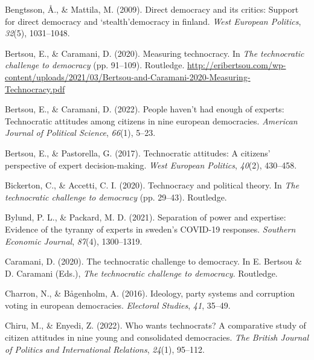 \documentclass[
  12pt,
  english,
]{article}
\newlength{\cslhangindent}
\newlength{\cslentryspacingunit} %
\newenvironment{CSLReferences}[2] %
 {%
  \setlength{\parindent}{0pt}
  \ifodd #1
  \let\oldpar\par
  \def\par{\hangindent=\cslhangindent\oldpar}
  \fi
  \setlength{\parskip}{#2\cslentryspacingunit}
 }%
 {}
\begin{document}
\hypertarget{refs}{}
\begin{CSLReferences}{1}{0}
\leavevmode{}%
Bengtsson, Å., \& Mattila, M. (2009). Direct democracy and its critics:
Support for direct democracy and `stealth'democracy in finland.
\emph{West European Politics}, \emph{32}(5), 1031--1048.

\leavevmode{}%
Bertsou, E., \& Caramani, D. (2020). Measuring technocracy. In \emph{The
technocratic challenge to democracy} (pp. 91--109). Routledge.
\url{http://eribertsou.com/wp-content/uploads/2021/03/Bertsou-and-Caramani-2020-Measuring-Technocracy.pdf}

\leavevmode{}%
Bertsou, E., \& Caramani, D. (2022). People haven't had enough of
experts: Technocratic attitudes among citizens in nine european
democracies. \emph{American Journal of Political Science}, \emph{66}(1),
5--23.

\leavevmode{}%
Bertsou, E., \& Pastorella, G. (2017). Technocratic attitudes: A
citizens' perspective of expert decision-making. \emph{West European
Politics}, \emph{40}(2), 430--458.

\leavevmode{}%
Bickerton, C., \& Accetti, C. I. (2020). Technocracy and political
theory. In \emph{The technocratic challenge to democracy} (pp. 29--43).
Routledge.

\leavevmode{}%
Bylund, P. L., \& Packard, M. D. (2021). Separation of power and
expertise: Evidence of the tyranny of experts in sweden's COVID-19
responses. \emph{Southern Economic Journal}, \emph{87}(4), 1300--1319.

\leavevmode{}%
Caramani, D. (2020). The technocratic challenge to democracy. In E.
Bertsou \& D. Caramani (Eds.), \emph{The technocratic challenge to
democracy}. Routledge.

\leavevmode{}%
Charron, N., \& Bågenholm, A. (2016). Ideology, party systems and
corruption voting in european democracies. \emph{Electoral Studies},
\emph{41}, 35--49.

\leavevmode{}%
Chiru, M., \& Enyedi, Z. (2022). Who wants technocrats? A comparative
study of citizen attitudes in nine young and consolidated democracies.
\emph{The British Journal of Politics and International Relations},
\emph{24}(1), 95--112.


\end{CSLReferences}
\end{document}
